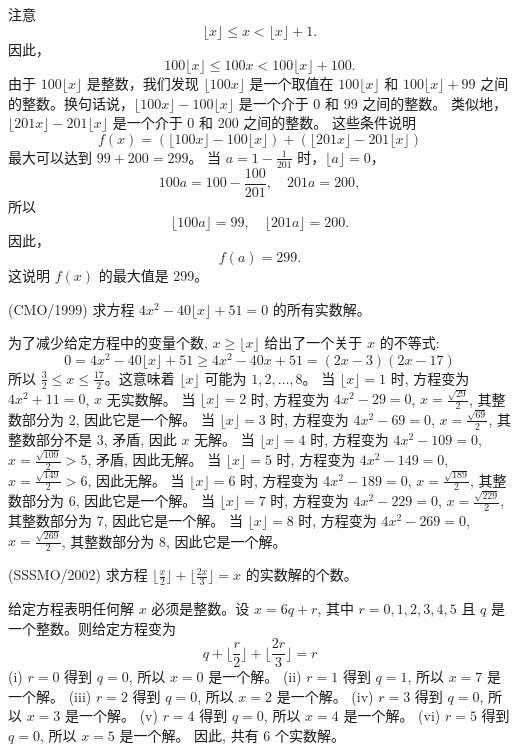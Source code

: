 \begin{questions}
\begin{solution}
注意
\[
\lfloor x \rfloor \le x < \lfloor x \rfloor + 1.
\]
因此，
\[
100\lfloor x \rfloor \le 100x < 100\lfloor x \rfloor + 100.
\]
由于 $100\lfloor x \rfloor$ 是整数，我们发现 $\lfloor 100x \rfloor$ 是一个取值在 $100\lfloor x \rfloor$ 和 $100\lfloor x \rfloor + 99$ 之间的整数。换句话说，$\lfloor 100x \rfloor - 100\lfloor x \rfloor$ 是一个介于 0 和 99 之间的整数。
类似地，$\lfloor 201x \rfloor - 201\lfloor x \rfloor$ 是一个介于 0 和 200 之间的整数。
这些条件说明
\[
f(x) = (\lfloor 100x \rfloor - 100\lfloor x \rfloor) + (\lfloor 201x \rfloor - 201\lfloor x \rfloor)
\]
最大可以达到 $99 + 200 = 299$。
当 $a = 1 - \frac{1}{201}$ 时，$\lfloor a \rfloor = 0$，
\[
100a = 100 - \frac{100}{201}, \quad 201a = 200,
\]
所以
\[
\lfloor 100a \rfloor = 99, \quad \lfloor 201a \rfloor = 200.
\]
因此，
\[
f(a) = 299.
\]
这说明 $f(x)$ 的最大值是 299。
\end{solution}
\question (CMO/1999) 求方程 $4x^2 - 40\lfloor x \rfloor + 51 = 0$ 的所有实数解。

\begin{solution}
为了减少给定方程中的变量个数, $x \ge \lfloor x \rfloor$ 给出了一个关于 $x$ 的不等式:
\[
0 = 4x^2 - 40\lfloor x \rfloor + 51 \ge 4x^2 - 40x + 51 = (2x - 3)(2x - 17)
\]
所以 $\frac{3}{2} \le x \le \frac{17}{2}$。这意味着 $\lfloor x \rfloor$ 可能为 $1, 2, \dots, 8$。
当 $\lfloor x \rfloor = 1$ 时, 方程变为 $4x^2 + 11 = 0$, $x$ 无实数解。
当 $\lfloor x \rfloor = 2$ 时, 方程变为 $4x^2 - 29 = 0$, $x = \frac{\sqrt{29}}{2}$, 其整数部分为 2, 因此它是一个解。
当 $\lfloor x \rfloor = 3$ 时, 方程变为 $4x^2 - 69 = 0$, $x = \frac{\sqrt{69}}{2}$, 其整数部分不是 3, 矛盾, 因此 $x$ 无解。
当 $\lfloor x \rfloor = 4$ 时, 方程变为 $4x^2 - 109 = 0$, $x = \frac{\sqrt{109}}{2} > 5$, 矛盾, 因此无解。
当 $\lfloor x \rfloor = 5$ 时, 方程变为 $4x^2 - 149 = 0$, $x = \frac{\sqrt{149}}{2} > 6$, 因此无解。
当 $\lfloor x \rfloor = 6$ 时, 方程变为 $4x^2 - 189 = 0$, $x = \frac{\sqrt{189}}{2}$, 其整数部分为 6, 因此它是一个解。
当 $\lfloor x \rfloor = 7$ 时, 方程变为 $4x^2 - 229 = 0$, $x = \frac{\sqrt{229}}{2}$, 其整数部分为 7, 因此它是一个解。
当 $\lfloor x \rfloor = 8$ 时, 方程变为 $4x^2 - 269 = 0$, $x = \frac{\sqrt{269}}{2}$, 其整数部分为 8, 因此它是一个解。
\end{solution}

\question (SSSMO/2002) 求方程 $\lfloor \frac{x}{2} \rfloor + \lfloor \frac{2x}{3} \rfloor = x$ 的实数解的个数。

\begin{solution}
给定方程表明任何解 $x$ 必须是整数。设 $x = 6q + r$, 其中 $r = 0, 1, 2, 3, 4, 5$ 且 $q$ 是一个整数。则给定方程变为
\[
q + \lfloor \frac{r}{2} \rfloor + \lfloor \frac{2r}{3} \rfloor = r
\]
(i) $r = 0$ 得到 $q = 0$, 所以 $x = 0$ 是一个解。
(ii) $r = 1$ 得到 $q = 1$, 所以 $x = 7$ 是一个解。
(iii) $r = 2$ 得到 $q = 0$, 所以 $x = 2$ 是一个解。
(iv) $r = 3$ 得到 $q = 0$, 所以 $x = 3$ 是一个解。
(v) $r = 4$ 得到 $q = 0$, 所以 $x = 4$ 是一个解。
(vi) $r = 5$ 得到 $q = 0$, 所以 $x = 5$ 是一个解。
因此, 共有 6 个实数解。
\end{solution}


\end{questions}
